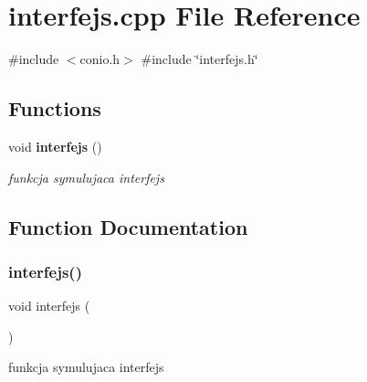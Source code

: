 \section{interfejs.\+cpp File Reference}
\label{interfejs_8cpp}
{\ttfamily \#include $<$conio.\+h$>$}\newline
{\ttfamily \#include \char`\"{}interfejs.\+h\char`\"{}}\newline
\subsection*{Functions}
\begin{DoxyCompactItemize}
\item 
void \textbf{ interfejs} ()
\begin{DoxyCompactList}\small\item\em funkcja symulujaca interfejs \end{DoxyCompactList}\end{DoxyCompactItemize}


\subsection{Function Documentation}
\mbox{\label{interfejs_8cpp_a3105c716b75322c6bbec3dfa0a457125}} 
\subsubsection{interfejs()}
{\footnotesize\ttfamily void interfejs (\begin{DoxyParamCaption}{ }\end{DoxyParamCaption})}



funkcja symulujaca interfejs 

